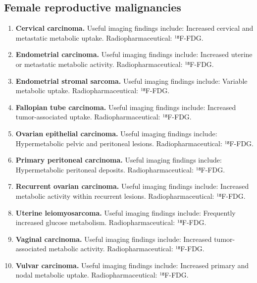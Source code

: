 \subsection{Female reproductive malignancies}
\begin{enumerate}[leftmargin=*,itemsep=0.45em,topsep=0.4em]
\item \textbf{Cervical carcinoma.} Useful imaging findings include: Increased cervical and metastatic metabolic uptake. Radiopharmaceutical: ¹⁸F-FDG.
\item \textbf{Endometrial carcinoma.} Useful imaging findings include: Increased uterine or metastatic metabolic activity. Radiopharmaceutical: ¹⁸F-FDG.
\item \textbf{Endometrial stromal sarcoma.} Useful imaging findings include: Variable metabolic uptake. Radiopharmaceutical: ¹⁸F-FDG.
\item \textbf{Fallopian tube carcinoma.} Useful imaging findings include: Increased tumor-associated uptake. Radiopharmaceutical: ¹⁸F-FDG.
\item \textbf{Ovarian epithelial carcinoma.} Useful imaging findings include: Hypermetabolic pelvic and peritoneal lesions. Radiopharmaceutical: ¹⁸F-FDG.
\item \textbf{Primary peritoneal carcinoma.} Useful imaging findings include: Hypermetabolic peritoneal deposits. Radiopharmaceutical: ¹⁸F-FDG.
\item \textbf{Recurrent ovarian carcinoma.} Useful imaging findings include: Increased metabolic activity within recurrent lesions. Radiopharmaceutical: ¹⁸F-FDG.
\item \textbf{Uterine leiomyosarcoma.} Useful imaging findings include: Frequently increased glucose metabolism. Radiopharmaceutical: ¹⁸F-FDG.
\item \textbf{Vaginal carcinoma.} Useful imaging findings include: Increased tumor-associated metabolic activity. Radiopharmaceutical: ¹⁸F-FDG.
\item \textbf{Vulvar carcinoma.} Useful imaging findings include: Increased primary and nodal metabolic uptake. Radiopharmaceutical: ¹⁸F-FDG.
\end{enumerate}

